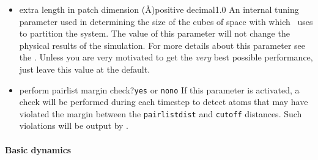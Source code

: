 \begin{itemize}
\item
{}%
{extra length in patch dimension (\AA)}{positive decimal}{1.0}%
{An internal tuning parameter used in determining the size of the cubes 
of space with which \NAMD\ uses to partition the system.  The value of 
this parameter will not change the physical results of the simulation.  
For more details about this parameter see the \PG.  
Unless you are very motivated to get the {\it very} best 
possible performance, just leave this value at the default.}

\item
{}%
{perform pairlist margin check?}{\verb!yes! or \verb!no!}{\verb!no!}%
{\label{param:margincheck}
If this parameter is activated, a check will be performed during 
each timestep to detect atoms that may have violated the margin 
between the \verb!pairlistdist! and \verb!cutoff! distances.  
Such violations will be output by \NAMD.}

\end{itemize}

\paragraph{Basic dynamics}

